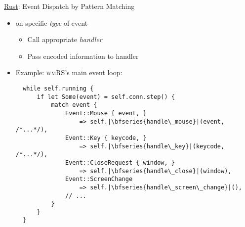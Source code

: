 \begin{frame}[fragile]{\underline{Rust}: Event Dispatch by Pattern Matching \hfill {\footnotesize \currentname}}


    \begin{itemize}

        \item {} on specific \textit{type} of event
            \begin{itemize}
                \item Call appropriate \textit{handler}
                \item Pass encoded information to handler
            \end{itemize}

        \item Example: \textsc{wmRS}'s main event loop:\\
\begin{verbatim}
  while self.running {
      if let Some(event) = self.conn.step() {
          match event {
              Event::Mouse { event, }
                  => self.|\bfseries{handle\_mouse}|(event, /*...*/),
              Event::Key { keycode, }
                  => self.|\bfseries{handle\_key}|(keycode, /*...*/),
              Event::CloseRequest { window, }
                  => self.|\bfseries{handle\_close}|(window),
              Event::ScreenChange
                  => self.|\bfseries{handle\_screen\_change}|(),
              // ...
          }
      }
  }
\end{verbatim}

    \end{itemize}

    \vfill

\end{frame}

